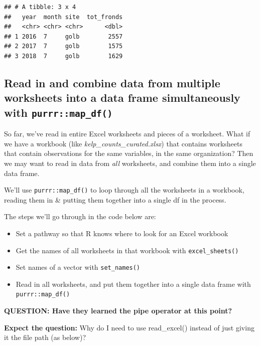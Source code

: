 \documentclass[]{book}
\providecommand{\tightlist}{%
  \setlength{\itemsep}{0pt}\setlength{\parskip}{0pt}}
\begin{document}
\begin{verbatim}
## # A tibble: 3 x 4
##   year  month site  tot_fronds
##   <chr> <chr> <chr>      <dbl>
## 1 2016  7     golb        2557
## 2 2017  7     golb        1575
## 3 2018  7     golb        1629
\end{verbatim}

\hypertarget{read-in-and-combine-data-from-multiple-worksheets-into-a-data-frame-simultaneously-with-purrrmap_df}{%
\subsection{\texorpdfstring{Read in and combine data from multiple worksheets into a data frame simultaneously with \texttt{purrr::map\_df()}}{Read in and combine data from multiple worksheets into a data frame simultaneously with purrr::map\_df()}}\label{read-in-and-combine-data-from-multiple-worksheets-into-a-data-frame-simultaneously-with-purrrmap_df}}

So far, we've read in entire Excel worksheets and pieces of a worksheet. What if we have a workbook (like \emph{kelp\_counts\_curated.xlsx}) that contains worksheets that contain observations for the same variables, in the same organization? Then we may want to read in data from \emph{all} worksheets, and combine them into a single data frame.

We'll use \texttt{purrr::map\_df()} to loop through all the worksheets in a workbook, reading them in \& putting them together into a single df in the process.

The steps we'll go through in the code below are:

\begin{itemize}
\tightlist
\item
  Set a pathway so that R knows where to look for an Excel workbook
\item
  Get the names of all worksheets in that workbook with \texttt{excel\_sheets()}
\item
  Set names of a vector with \texttt{set\_names()}
\item
  Read in all worksheets, and put them together into a single data frame with \texttt{purrr::map\_df()}
\end{itemize}

\textbf{QUESTION: Have they learned the pipe operator at this point?}

\textbf{Expect the question:} Why do I need to use read\_excel() instead of just giving it the file path (as below)?
\end{document}
